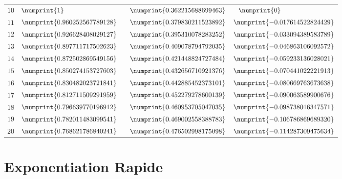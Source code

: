 \documentclass[a4paper, twoside]{article}
\begin{document}
\begin{center}
\begin{large}
\begin{tabular}{c||l||l|l}
	$10$ & $\numprint{1}$ & $ \phantom{-}\numprint{0.362215688699463}$ & $ \phantom{-}\numprint{0} $\\

	$11$ & $\numprint{0.960252567789128}$ & $ \phantom{-}\numprint{0.379830211523892}$ & $ \numprint{-0.017614522824429} $\\

	$12$ & $\numprint{0.926628408029127}$ & $ \phantom{-}\numprint{0.395310078283252}$ & $ \numprint{-0.033094389583789} $\\

	$13$ & $\numprint{0.897711717502623}$ & $ \phantom{-}\numprint{0.409078794792035}$ & $ \numprint{-0.046863106092572} $\\

	$14$ & $\numprint{0.872502869549156}$ & $ \phantom{-}\numprint{0.421448824727484}$ & $ \numprint{-0.059233136028021} $\\

	$15$ & $\numprint{0.850274153727603}$ & $ \phantom{-}\numprint{0.432656710921376}$ & $ \numprint{-0.070441022221913} $\\

	$16$ & $\numprint{0.830482023721841}$ & $ \phantom{-}\numprint{0.442885452373101}$ & $ \numprint{-0.080669763673638} $\\

	$17$ & $\numprint{0.812711509291959}$ & $ \phantom{-}\numprint{0.452279278600139}$ & $ \numprint{-0.090063589900676} $\\

	$18$ & $\numprint{0.796639770196912}$ & $ \phantom{-}\numprint{0.460953705047035}$ & $ \numprint{-0.098738016347571} $\\

	$19$ & $\numprint{0.782011483099541}$ & $ \phantom{-}\numprint{0.469002558388783}$ & $ \numprint{-0.106786869689320} $\\

	$20$ & $\numprint{0.768621786840241}$ & $ \phantom{-}\numprint{0.476502998175098}$ & $ \numprint{-0.114287309475634} $\\

	\end{tabular}
	\end{large}
	\end{center}


	\newpage

	\section{Exponentiation Rapide} \label{exponentiation_rapide}
\end{document}
